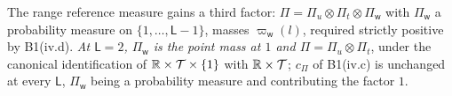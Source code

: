 %
%
%
%
The range reference measure gains a third factor: $\Pi=\Pi_u\otimes\Pi_t\otimes\Pi_{\mathsf w}$ with
$\Pi_{\mathsf w}$ a probability measure on $\{1,\dots,\mathsf L-1\}$, masses $\varpi_{\mathsf w}(l)$,
required strictly positive by B1(iv.d). \emph{At $\mathsf L=2$, $\Pi_{\mathsf w}$ is the point mass at
$1$ and $\Pi=\Pi_u\otimes\Pi_t$}, under the canonical identification of $\mathbb{R}\times\mathcal T\times\{1\}$
with $\mathbb{R}\times\mathcal T$; $c_\Pi$ of B1(iv.c) is unchanged at every $\mathsf L$, $\Pi_{\mathsf w}$
being a probability measure and contributing the factor $1$.

